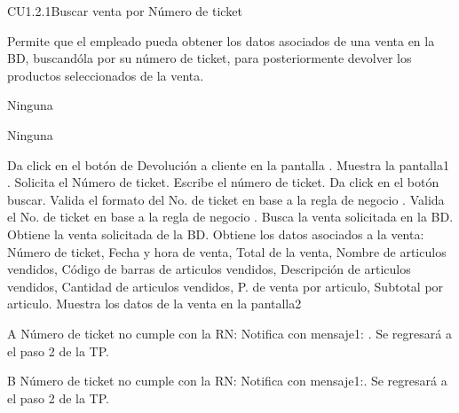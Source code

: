 \begin{UseCase} {CU1.2.1}{Buscar venta por Número de ticket}{
	
	Permite que el empleado pueda obtener los datos asociados de una venta en la BD, buscandóla por su número de ticket, para posteriormente devolver los productos seleccionados de la venta.
}
{	}
	{
		Ninguna
	}
	{
		\UCli	{}
		\UCli	{}
		\UCli	{}
		\UCli	{}
		
	}
	{
		Ninguna
	}
\end{UseCase}


\begin{UCtrayectoria}
	\UCpaso [\UCactor] Da click en el botón de Devolución a cliente en la pantalla . 
	\UCpaso [\UCsist] Muestra la pantalla1 .
	\UCpaso [\UCsist] Solicita el Número de ticket.
	\UCpaso [\UCactor] Escribe el número de ticket. 
	\UCpaso [\UCactor] Da click en el botón buscar. 
	\UCpaso [\UCsist] Valida el formato del No. de ticket en base a la regla de negocio .
	\UCpaso [\UCsist] Valida el No. de ticket en base a la regla de negocio .
	\UCpaso [\UCsist] Busca la venta solicitada en la BD. 
	\UCpaso [\UCsist] Obtiene la venta solicitada de la BD. 
	\UCpaso [\UCsist] Obtiene los datos asociados a la venta: Número de ticket, Fecha y hora de venta, Total de la venta, Nombre de articulos vendidos, Código de barras de articulos vendidos, Descripción de articulos vendidos, Cantidad de articulos vendidos, P. de venta por articulo, Subtotal por articulo.
	\UCpaso [\UCsist] Muestra los datos de la venta en la pantalla2 
	

	
\end{UCtrayectoria}


\begin{UCtrayectoriaA}{A}{ Número de ticket no cumple con la RN: }
	\UCpaso [\UCsist] Notifica con mensaje1: .
	\UCpaso [\UCsist] Se regresará a el paso 2 de la TP.
\end{UCtrayectoriaA}
\begin{UCtrayectoriaA}{B}{ Número de ticket no cumple con la RN: }
	\UCpaso [\UCsist] Notifica con mensaje1:.
	\UCpaso [\UCsist] Se regresará a el paso 2 de la TP.
\end{UCtrayectoriaA}

